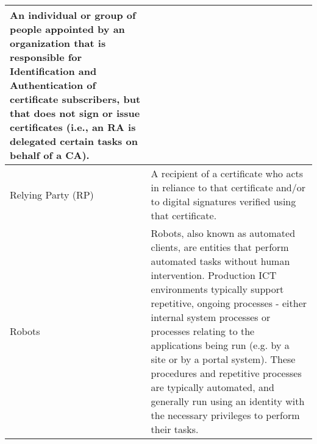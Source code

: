 \begin{tabular}{|p{}|p{}|}
An individual or group of people appointed by an organization that is responsible for Identification and Authentication of certificate subscribers, but that does not sign or issue certificates (i.e., an RA is delegated certain tasks on behalf of a CA).\\
\hline
Relying Party (RP) & 
A recipient of a certificate who acts in reliance to that certificate and/or to digital signatures verified using that certificate. \\
\hline
Robots &
Robots, also known as automated clients, are entities that perform automated tasks without human intervention. Production ICT environments typically support repetitive, ongoing processes - either internal system processes or processes relating to the applications being run (e.g. by a site or by a portal system). These procedures and repetitive processes are typically automated, and generally run using an identity with the necessary privileges to perform their tasks. \\
\hline
\end{tabular}


